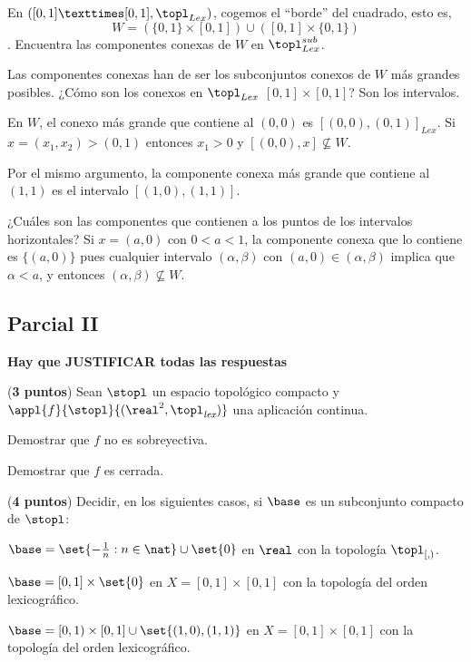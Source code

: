 \begin{problem} En $([0,1]×[0,1], \topl_{Lex})$, cogemos el ``borde'' del cuadrado, esto es, \[W = \left(\{0,1\} × [0,1]\right) ∪ \left([0,1] × \{0,1\}\right) \]. Encuentra las componentes conexas de $W$ en $\topl_{Lex}^{sub}$.
\solution

Las componentes conexas han de ser los subconjuntos conexos de $W$ más grandes posibles. ¿Cómo son los conexos en $\topl_{Lex}$ $[0,1]×[0,1]$? Son los intervalos.

En $W$, el conexo más grande que contiene al $(0,0)$ es $[(0,0), (0,1)]_{Lex}$. Si $x = (x_1, x_2) > (0,1)$ entonces $x_1 > 0$ y $[(0,0), x] \nsubseteq W$.

Por el mismo argumento, la componente conexa más grande que contiene al $(1,1)$ es el intervalo $[(1,0), (1,1)]$.

¿Cuáles son las componentes que contienen a los puntos de los intervalos horizontales? Si $x = (a,0)$ con $0<a<1$, la componente conexa que lo contiene es $\{(a,0)\}$ pues cualquier intervalo $(α,β)$ con $(a,0) ∈ (α,β)$ implica que $α < a$, y entonces $(α,β) \nsubseteq W$.
\end{problem}


\newpage
\subsection{Parcial II}
{\bf Hay que JUSTIFICAR todas las respuestas}

\begin{problem}[1] ({\bf 3 puntos}) Sean $\stopl$ un espacio topológico compacto y $\appl{f}{\stopl}{(\real^2, \topl_{\textit{lex}})}$ una aplicación continua.

\ppart Demostrar que $f$ no es sobreyectiva.

\ppart Demostrar que $f$ es cerrada.

\solution
\end{problem}


\begin{problem} ({\bf 4 puntos}) Decidir, en los siguientes casos, si $\base$ es un subconjunto compacto de $\stopl$:

\ppart ${\base = \set{-\frac{1}{n} : n \in \nat} \cup \set{0}}$ en $\real$ con la topología $\topl_{[,)}$.

\ppart ${\base = [0,1] \times \set{0} }$ en ${X = [0,1] \times [0,1] }$ con la topología del orden lexicográfico.

\ppart ${\base = [0,1) \times [0,1] \cup \set{(1,0), (1,1)} }$ en ${X = [0,1] \times [0,1] }$ con la topología del orden lexicográfico.

\solution
\end{problem}


